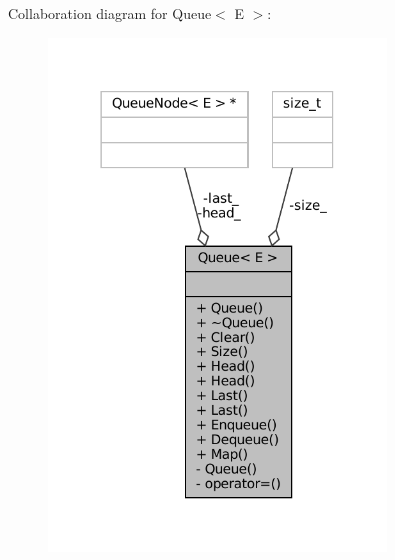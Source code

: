 Collaboration diagram for Queue$<$ E $>$\+:
\nopagebreak
\begin{figure}[H]
\begin{center}
\leavevmode
\includegraphics[width=254pt]{classQueue__coll__graph}
\end{center}
\end{figure}
